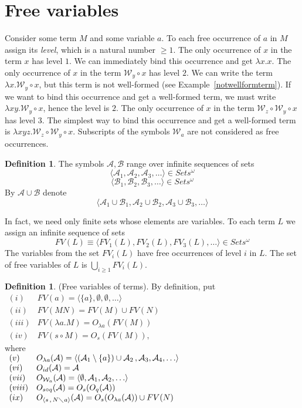 \documentclass[11pt]{amsart}
\theoremstyle{plain}
\theoremstyle{definition}
\newtheorem{definition}[theorem]{Definition}
\theoremstyle{remark}
\numberwithin{equation}{section}
\newcommand{\ci}{\circ}
\newcommand{\mi}{\,,\,}
\newcommand{\is}{\diagdown}
\newcommand{\x}{a}
\renewcommand{\pi}{\mathcal{W}}
\begin{document}
\section{Free variables}
Consider some term $M$ and some variable $\x$. To each free
occurrence of $\x$ in $M$ assign its \emph{level}, which is a
natural number $\geqslant 1$. The only occurrence of $x$ in the
term $x$ has  level $1$. We can immediately bind this occurrence
and get $\lambda x.x$. The only occurrence of $x$ in the term
$\pi_y\ci x$ has  level $2$. We can write the term $\lambda
x.\pi_y\ci x$, but this term is not well-formed (see
Example~\ref{notwellformterm}). If we want to bind this occurrence
and get a well-formed term, we must write $\lambda x y.\pi_y\ci
x$, hence the level is $2$. The only occurrence of $x$ in the term
$\pi_z\ci\pi_y\ci x$ has  level $3$. The simplest way to bind this
occurrence and get a well-formed term is $\lambda x y
z.\pi_z\ci\pi_y\ci x$. Subscripts of the symbols $\pi_a$ are not
considered as free occurrences.
\begin{definition} The symbols $\mathcal{A,B}$ range over infinite
sequences of sets
$$\langle \mathcal{A}_1,\mathcal{A}_2,\mathcal{A}_3,\ldots\rangle\in Sets^\omega$$
$$\langle \mathcal{B}_1,\mathcal{B}_2,\mathcal{B}_3,\ldots\rangle\in Sets^\omega$$
By $\mathcal{A}\cup\mathcal{B}$ denote
$$\langle\mathcal{A}_1\cup\mathcal{B}_1,\mathcal{A}_2\cup\mathcal{B}_2,\mathcal{A}_3\cup\mathcal{B}_3,\ldots\rangle$$
\end{definition}
In fact, we need only finite sets whose elements are variables. To
each term $L$ we assign an infinite sequence of sets
$$FV(L)\equiv\langle
 FV_1(L),FV_2(L),FV_3(L),\ldots\rangle\in Sets^\omega$$
 The variables from the set $FV_i(L)$ have free occurrences of  level
 $i$ in $L$.
 The set of free variables of $L$ is $\bigcup_{i\geqslant 1}
 FV_i(L)$.
\begin{definition}(Free variables of terms). By definition, put\label{FV}\\
$
\begin{array}{ll}
(i) & FV(\x)=\langle \{\x\},\emptyset,\emptyset,\ldots\rangle\\
(ii) & FV(MN)=FV(M)\cup FV(N)\\
(iii) & FV(\lambda \x.M)=O_{\lambda \x}(FV(M))\\
(iv) & FV(s\ci M)=O_s(FV(M)),
\end{array}
$\\[5pt]
where\\[5pt] $
\begin{array}{ll}
(v) & O_{\lambda \x}(\mathcal{A})=
 \langle(\mathcal{A}_1\setminus\{\x\})\cup\mathcal{A}_2\,,\mathcal{A}_3,\mathcal{A}_4,\ldots\rangle\\
(vi) & O_{id}(\mathcal{A})=\mathcal{A}\\
(vii) &
O_{\pi_{\x}}(\mathcal{A})=\langle\emptyset,\mathcal{A}_1,\mathcal{A}_2,\ldots\rangle\\
(viii) & O_{s\circ q}(\mathcal{A})=O_s(O_{q}(\mathcal{A}))\\
(ix) & O_{\langle s\mi N\is \x\rangle}(\mathcal{A})=O_s(O_{\lambda
\x}(\mathcal{A}))\cup
 FV(N)
 \end{array}$
\end{definition}
\end{document}
